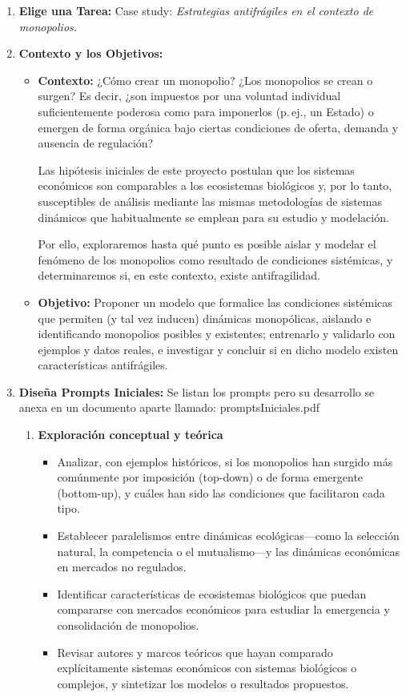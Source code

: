 \documentclass[a4paper,12pt]{article}
\begin{document}
\begin{enumerate}
    \item \textbf{Elige una Tarea:} Case study: \textit{Estrategias antifrágiles en el contexto de monopolios.}
    \item \textbf{Contexto y los Objetivos:}
    \begin{itemize}
    \item \textbf{Contexto:} ¿Cómo crear un monopolio? ¿Los monopolios se crean o surgen? Es decir, ¿son impuestos por una voluntad individual suficientemente poderosa como para imponerlos (p.\,ej., un Estado) o emergen de forma orgánica bajo ciertas condiciones de oferta, demanda y ausencia de regulación?

    Las hipótesis iniciales de este proyecto postulan que los sistemas económicos son comparables a los ecosistemas biológicos y, por lo tanto, susceptibles de análisis mediante las mismas metodologías de sistemas dinámicos que habitualmente se emplean para su estudio y modelación.

    Por ello, exploraremos hasta qué punto es posible aislar y modelar el fenómeno de los monopolios como resultado de condiciones sistémicas, y determinaremos si, en este contexto, existe antifragilidad.
    \item \textbf{Objetivo:} Proponer un modelo que formalice las condiciones sistémicas que permiten (y tal vez inducen) dinámicas monopólicas, aislando e identificando monopolios posibles y existentes; entrenarlo y validarlo con ejemplos y datos reales, e investigar y concluir si en dicho modelo existen características antifrágiles.
    \end{itemize}
    \item \textbf{Diseña Prompts Iniciales:}
    Se listan los prompts pero su desarrollo se anexa en un documento aparte llamado: promptsIniciales.pdf
    \begin{enumerate}
            \item \textbf{Exploración conceptual y teórica}
    \begin{itemize}
        \item Analizar, con ejemplos históricos, si los monopolios han surgido más comúnmente por imposición (top-down) o de forma emergente (bottom-up), y cuáles han sido las condiciones que facilitaron cada tipo.
        \item Establecer paralelismos entre dinámicas ecológicas—como la selección natural, la competencia o el mutualismo—y las dinámicas económicas en mercados no regulados.
        \item Identificar características de ecosistemas biológicos que puedan compararse con mercados económicos para estudiar la emergencia y consolidación de monopolios.
        \item Revisar autores y marcos teóricos que hayan comparado explícitamente sistemas económicos con sistemas biológicos o complejos, y sintetizar los modelos o resultados propuestos.
    \end{itemize}


\end{enumerate}
\end{enumerate}
\end{document}
